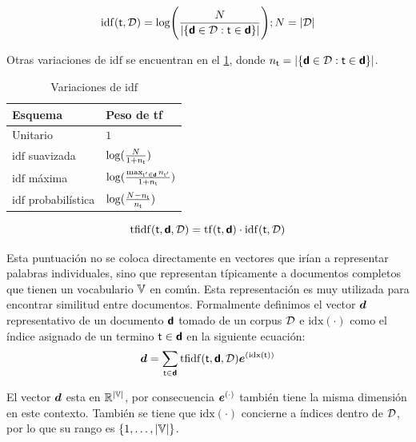 \begin{equation} \label{eq:idf-repr}
  \mathrm{idf}({\mathit{\mathsf{t}}}, \mathcal{D}) = \mathrm{log}\Bigg( \frac{N}{|\{{\bm{\mathit{\mathsf{d}}}} \in \mathcal{D} : {\mathit{\mathsf{t}}} \in {\bm{\mathit{\mathsf{d}}}}\}|} \Bigg) ; N = |\mathcal{D}|
\end{equation}

Otras variaciones de $\mathrm{idf}$ se encuentran en el \cref{table:idf}, donde $n_{\mathit{\mathsf{t}}} = |\{{\bm{\mathit{\mathsf{d}}}} \in \mathcal{D} : {\mathit{\mathsf{t}}} \in {\bm{\mathit{\mathsf{d}}}}\}|$.

\begin{table}[h!]
\centering
\begin{tabular}{|l|l|} \hline
  \textbf{Esquema}          & \textbf{Peso de tf} \\ \hline
  Unitario                      & $1$ \\ \hline
  $\mathrm{idf}$ suavizada      & $\log(\frac{N}{1+n_{\mathit{\mathsf{t}}}})$ \\ \hline
  $\mathrm{idf}$ máxima         & $\log(\frac{\max_{{\mathit{\mathsf{t}}}^{\prime}\in{\bm{\mathit{\mathsf{d}}}}}n_{{\mathit{\mathsf{t}}}^{\prime}}}{1+n_{\mathit{\mathsf{t}}}})$ \\ \hline
  $\mathrm{idf}$ probabilística & $\log(\frac{N - n_{\mathit{\mathsf{t}}}}{n_{\mathit{\mathsf{t}}}})$ \\ \hline
\end{tabular}
\caption{Variaciones de $\mathrm{idf}$}
\label{table:idf}
\end{table}

\begin{equation} \label{eq:tfidf-repr}
  \mathrm{tfidf}({\mathit{\mathsf{t}}}, {\bm{\mathit{\mathsf{d}}}}, \mathcal{D}) = \mathrm{tf}({\mathit{\mathsf{t}}}, {\bm{\mathit{\mathsf{d}}}}) \cdot \mathrm{idf}({\mathit{\mathsf{t}}}, \mathcal{D})
\end{equation}

Esta puntuación no se coloca directamente en vectores que irían a representar palabras individuales, sino que representan típicamente a documentos completos que tienen un vocabulario ${\mathbb{V}}$ en común. Esta representación es muy utilizada para encontrar similitud entre documentos. Formalmente definimos el vector ${\bm{d}}$ representativo de un documento ${\bm{\mathit{\mathsf{d}}}}$ tomado de un \gls{corpus} $\mathcal{D}$ e $\mathrm{idx}(\cdot)$ como el índice asignado de un termino ${\mathit{\mathsf{t}}}\in{\bm{\mathit{\mathsf{d}}}}$ en la siguiente ecuación:
\begin{equation}
  {\bm{d}} = \sum_{{\mathit{\mathsf{t}}}\in{\bm{\mathit{\mathsf{d}}}}} \mathrm{tfidf}({\mathit{\mathsf{t}}}, {\bm{\mathit{\mathsf{d}}}}, \mathcal{D}) {\bm{e}}^{(\mathrm{idx({\mathit{\mathsf{t}}})})}
\end{equation}

El vector ${\bm{d}}$ esta en $\mathbb{R}^{|{\mathbb{V}}|}$, por consecuencia ${\bm{e}}^{(\cdot)}$ también tiene la misma dimensión en este contexto. También se tiene que $\mathrm{idx}(\cdot)$ concierne a índices dentro de $\mathcal{D}$, por lo que su rango es $\{ 1, \ldots, |{\mathbb{V}}| \}$.


